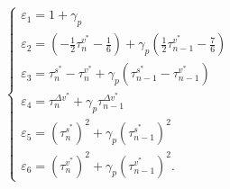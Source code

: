 \documentclass[journal]{IEEEtran}
\begin{document}
\begin{equation}
  \left\{ \begin{array}{l}
    {\varepsilon _1} = 1 + {\gamma _p}                                                                                                                           \\
    {\varepsilon _2} = \left( { - \frac{1}{2}\tau _n^{{v^*}} - \frac{1}{6}} \right) + {\gamma _p}\left( {\frac{1}{2}\tau _{n - 1}^{{v^*}} - \frac{7}{6}} \right) \\
    {\varepsilon _3} = \tau _n^{{s^*}} - \tau _n^{{v^*}} + {\gamma _p}\left( {\tau _{n - 1}^{{s^*}} - \tau _{n - 1}^{{v^*}}} \right)                             \\
    {\varepsilon _4} = \tau _n^{\Delta {v^*}} + {\gamma _p}\tau _{n - 1}^{\Delta {v^*}}                                                                          \\
    {\varepsilon _5} = {\left( {\tau _n^{{s^*}}} \right)^2} + {\gamma _p}{\left( {\tau _{n - 1}^{{s^*}}} \right)^2}                                              \\
    {\varepsilon _6} = {\left( {\tau _n^{{v^*}}} \right)^2} + {\gamma _p}{\left( {\tau _{n - 1}^{{v^*}}} \right)^2}.
  \end{array} \right.
\end{equation}
\end{document}
